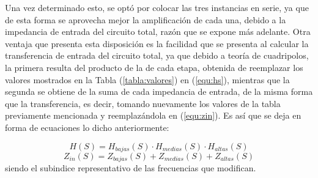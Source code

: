 Una vez determinado esto, se optó por colocar las tres instancias en serie, ya que de esta forma se aprovecha mejor la amplificación de cada una, debido a la impedancia de entrada del circuito total, razón que se expone más adelante. Otra ventaja que presenta esta disposición es la facilidad que se presenta al calcular la transferencia de entrada del circuito total, ya que debido a teoría de cuadripolos, la primera resulta del producto de la de cada etapa, obtenida de reemplazar los valores mostrados en la Tabla (\ref{tabla:valores}) en (\ref{equ:hs}), mientras que la segunda se obtiene de la suma de cada impedancia de entrada, de la misma forma que la transferencia, es decir, tomando nuevamente los valores de la tabla previamente mencionada y reemplazándola en (\ref{equ:zin}). Es así que se deja en forma de ecuaciones lo dicho anteriormente:

\begin{equation}
	H(S) = H_{bajas}(S) \cdot H_{medias}(S) \cdot H_{altas}(S)
\end{equation}
\begin{equation}
	Z_{in}(S) = Z_{bajas}(S) + Z_{medias}(S) + Z_{altas}(S)
\end{equation}
siendo el subindice representativo de las frecuencias que modifican.

